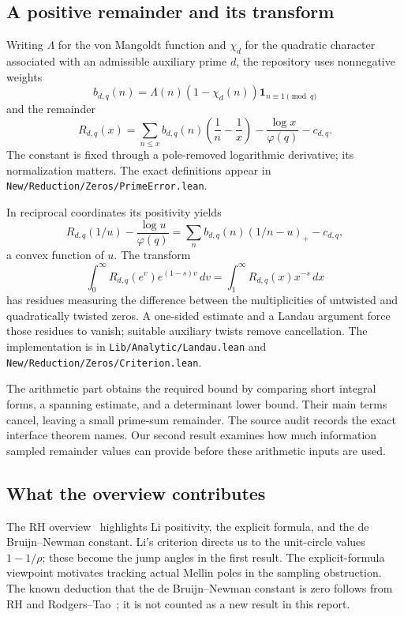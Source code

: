 \documentclass[11pt,a4paper]{article}
\theoremstyle{definition}
\theoremstyle{remark}
\numberwithin{equation}{section}
\begin{document}
\subsection{A positive remainder and its transform}

Writing $\Lambda$ for the von Mangoldt function and $\chi_d$ for the
quadratic character associated with an admissible auxiliary prime $d$,
the repository uses nonnegative weights
\[
 b_{d,q}(n)=\Lambda(n)(1-\chi_d(n))\mathbf 1_{n\equiv1\pmod q}
\]
and the remainder
\begin{equation}\label{eq:upstream-remainder}
 R_{d,q}(x)=\sum_{n\leq x}b_{d,q}(n)
       \left(\frac1n-\frac1x\right)
       -\frac{\log x}{\varphi(q)}-c_{d,q}.
\end{equation}
The constant is fixed through a pole-removed logarithmic derivative;
its normalization matters. The exact definitions appear in
\texttt{New/Reduction/Zeros/PrimeError.lean}.

In reciprocal coordinates its positivity yields
\[
 R_{d,q}(1/u)-\frac{\log u}{\varphi(q)}
 =\sum_n b_{d,q}(n)(1/n-u)_+-c_{d,q},
\]
a convex function of $u$. The transform
\[
 \int_0^\infty R_{d,q}(e^v)e^{(1-s)v}\,dv
 =\int_1^\infty R_{d,q}(x)x^{-s}\,dx
\]
has residues measuring the difference between the multiplicities of
untwisted and quadratically twisted zeros. A one-sided estimate and a
Landau argument force those residues to vanish; suitable auxiliary
twists remove cancellation. The implementation is in
\texttt{Lib/Analytic/Landau.lean} and
\texttt{New/Reduction/Zeros/Criterion.lean}.

The arithmetic part obtains the required bound by comparing short
integral forms, a spanning estimate, and a determinant lower bound.
Their main terms cancel, leaving a small prime-sum remainder. The
source audit records the exact interface theorem names. Our second
result examines how much information sampled remainder values can
provide before these arithmetic inputs are used.

\subsection{What the overview contributes}

The RH overview~\cite{WikipediaRH} highlights Li positivity, the
explicit formula, and the de Bruijn--Newman constant. Li's criterion
directs us to the unit-circle values $1-1/\rho$; these become the jump
angles in the first result. The explicit-formula viewpoint motivates
tracking actual Mellin poles in the sampling obstruction. The known
deduction that the de Bruijn--Newman constant is zero follows from RH
and Rodgers--Tao~\cite{RodgersTao}; it is not counted as a new result in
this report.
\end{document}
